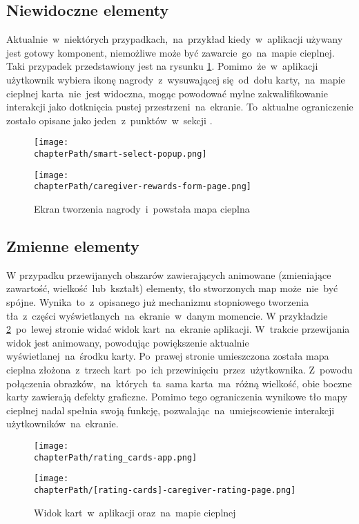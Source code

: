 \subsection{Niewidoczne elementy}
Aktualnie~w~niektórych przypadkach,~na~przykład kiedy~w~aplikacji używany jest gotowy komponent, niemożliwe może być zawarcie~go~na~mapie cieplnej. Taki przypadek przedstawiony jest na rysunku \ref{fig:rs_reward_form}. Pomimo~że~w~aplikacji użytkownik wybiera ikonę nagrody~z~wysuwającej się~od~dołu karty,~na~mapie cieplnej karta~nie~jest widoczna, mogąc powodować mylne zakwalifikowanie interakcji jako dotknięcia pustej przestrzeni~na~ekranie. To~aktualne ograniczenie zostało opisane jako jeden~z~punktów~w~sekcji .

\bigskip
\begin{figure}[H]
\centering
\begin{minipage}{.3\textwidth}
	\centering
	\texttt{[image: \\chapterPath/smart-select-popup.png]}
\end{minipage}
\begin{minipage}{.3\textwidth}
	\centering
	\texttt{[image: \\chapterPath/caregiver-rewards-form-page.png]}
\end{minipage}
\bigskip
\caption{Ekran tworzenia nagrody~i~powstała mapa cieplna}
\label{fig:rs_reward_form}
\end{figure}

\subsection{Zmienne elementy}
W przypadku przewijanych obszarów zawierających animowane (zmieniające zawartość, wielkość~lub~kształt) elementy, tło stworzonych map może~nie~być spójne. Wynika~to~z~opisanego już mechanizmu stopniowego tworzenia tła~z~części wyświetlanych~na~ekranie~w~danym momencie. W przykładzie \ref{fig:rs_rating_cards}~po~lewej stronie widać widok kart~na~ekranie aplikacji. W~trakcie przewijania widok jest animowany, powodując powiększenie aktualnie wyświetlanej~na~środku karty. Po~prawej stronie umieszczona została mapa cieplna złożona~z~trzech kart~po~ich przewinięciu~przez~użytkownika. Z~powodu połączenia obrazków,~na~których~ta~sama karta~ma~różną wielkość, obie boczne karty zawierają defekty graficzne. Pomimo tego ograniczenia wynikowe tło mapy cieplnej nadal spełnia swoją funkcję, pozwalając~na~umiejscowienie interakcji użytkowników~na~ekranie.

\bigskip
\begin{figure}[H]
\begin{minipage}{.25\textwidth}
	\centering
	\texttt{[image: \\chapterPath/rating\_cards-app.png]}
\end{minipage}
\begin{minipage}{.74\textwidth}
	\centering
	\texttt{[image: \\chapterPath/[rating-cards]-caregiver-rating-page.png]}
\end{minipage}
\bigskip
\caption{Widok kart~w~aplikacji oraz~na~mapie cieplnej}
\label{fig:rs_rating_cards}
\end{figure}
